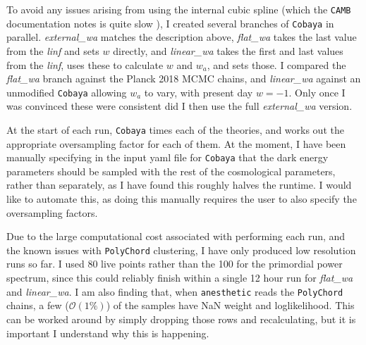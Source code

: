 \documentclass{article}
\begin{document}
To avoid any issues arising from using the internal cubic spline (which the \texttt{CAMB} documentation notes is quite slow \cite{CAMBdocs}), I created several branches of \texttt{Cobaya} in parallel. \textit{external\_wa} matches the description above, \textit{flat\_wa} takes the last value from the \textit{linf} and sets $w$ directly, and \textit{linear\_wa} takes the first and last values from the \textit{linf}, uses these to calculate $w$ and $w_a$, and sets those. I compared the \textit{flat\_wa} branch against the Planck 2018 MCMC chains, and \textit{linear\_wa} against an unmodified \texttt{Cobaya} allowing $w_a$ to vary, with present day $w=-1$. Only once I was convinced these were consistent did I then use the full \textit{external\_wa} version.

At the start of each run, \texttt{Cobaya} times each of the theories, and works out the appropriate oversampling factor for each of them. At the moment, I have been manually specifying in the input yaml file for \texttt{Cobaya} that the dark energy parameters should be sampled with the rest of the cosmological parameters, rather than separately, as I have found this roughly halves the runtime. I would like to automate this, as doing this manually requires the user to also specify the oversampling factors.

Due to the large computational cost associated with performing each run, and the known issues with \texttt{PolyChord} clustering, I have only produced low resolution runs so far. I used 80 live points rather than the 100 for the primordial power spectrum, since this could reliably finish within a single 12 hour run for \textit{flat\_wa} and \textit{linear\_wa}. I am also finding that, when \texttt{anesthetic} reads the \texttt{PolyChord} chains, a few ($\mathcal{O}(1\%)$) of the samples have NaN weight and loglikelihood. This can be worked around by simply dropping those rows and recalculating, but it is important I understand why this is happening. 
\end{document}
